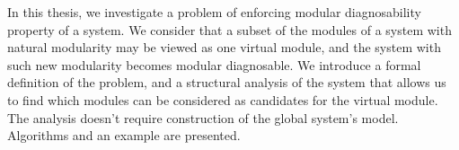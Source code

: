 % 
% 
%
In this thesis, we investigate a problem of enforcing modular
diagnosability property of a system. We consider that a subset of the modules of
a system with natural modularity may be viewed as one virtual module, and the
system with such new modularity becomes modular diagnosable. We introduce a
formal definition of the problem, and a structural analysis of the system that
allows us to find which modules can be considered as candidates for the virtual
module. The analysis doesn't require construction of the global system's model.
Algorithms and an example are presented.
